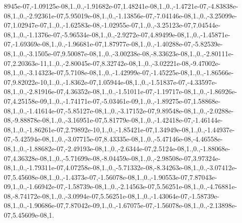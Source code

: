 {8945e-\/07,-\/1.\-09125e-\/08,1.,0.,-\/1.\-91682e-\/07,1.\-48241e-\/08,1.,0.,-\/1.\-4721e-\/07,-\/4.\-83838e-\/08,1.,0.,-\/2.\-92361e-\/07,5.\-95019e-\/08,1.,0.,-\/1.\-13856e-\/07,-\/7.\-04146e-\/08,1.,0.,-\/3.\-25099e-\/07,1.\-02947e-\/07,1.,0.,-\/1.\-62583e-\/08,-\/1.\-02955e-\/07,1.,0.,-\/3.\-25123e-\/07,7.\-04544e-\/08,1.,0.,-\/1.\-1376e-\/07,-\/5.\-96534e-\/08,1.,0.,-\/2.\-9272e-\/07,4.\-89499e-\/08,1.,0.,-\/1.\-45871e-\/07,-\/1.\-69369e-\/08,1.,0.,-\/1.\-96681e-\/07,1.\-87977e-\/08,1.,0.,-\/1.\-40288e-\/07,-\/5.\-82539e-\/08,1.,0.,-\/3.\-1505e-\/07,9.\-50087e-\/08,1.,0.,-\/3.\-00238e-\/08,-\/8.\-33623e-\/08,1.,0.,-\/2.\-80111e-\/07,2.\-20363e-\/11,1.,0.,-\/2.\-80045e-\/07,8.\-32742e-\/08,1.,0.,-\/3.\-02221e-\/08,-\/9.\-47002e-\/08,1.,0.,-\/3.\-14323e-\/07,5.\-7108e-\/08,1.,0.,-\/1.\-42999e-\/07,-\/1.\-45225e-\/08,1.,0.,-\/1.\-86566e-\/07,9.\-82022e-\/10,1.,0.,-\/1.\-8362e-\/07,1.\-05944e-\/08,1.,0.,-\/1.\-51837e-\/07,-\/4.\-33597e-\/08,1.,0.,-\/2.\-81916e-\/07,4.\-36352e-\/08,1.,0.,-\/1.\-51011e-\/07,-\/1.\-19717e-\/08,1.,0.,-\/1.\-86926e-\/07,4.\-25158e-\/09,1.,0.,-\/1.\-74171e-\/07,-\/5.\-03461e-\/09,1.,0.,-\/1.\-89275e-\/07,1.\-58868e-\/08,1.,0.,-\/1.\-41614e-\/07,-\/5.\-85127e-\/08,1.,0.,-\/3.\-17152e-\/07,9.\-89548e-\/08,1.,0.,-\/2.\-0288e-\/08,-\/9.\-88878e-\/08,1.,0.,-\/3.\-16951e-\/07,5.\-81779e-\/08,1.,0.,-\/1.\-42418e-\/07,-\/1.\-46144e-\/08,1.,0.,-\/1.\-86261e-\/07,2.\-79892e-\/10,1.,0.,-\/1.\-85421e-\/07,1.\-34949e-\/08,1.,0.,-\/1.\-44937e-\/07,-\/5.\-42594e-\/08,1.,0.,-\/3.\-07715e-\/07,8.\-43335e-\/08,1.,0.,-\/5.\-47146e-\/08,-\/4.\-46558e-\/08,1.,0.,-\/1.\-88682e-\/07,-\/2.\-49193e-\/08,1.,0.,-\/2.\-6344e-\/07,2.\-5124e-\/08,1.,0.,-\/1.\-88068e-\/07,4.\-36328e-\/08,1.,0.,-\/5.\-71699e-\/08,-\/8.\-04459e-\/08,1.,0.,-\/2.\-98508e-\/07,3.\-97324e-\/08,1.,0.,-\/1.\-79311e-\/07,4.\-07258e-\/08,1.,0.,-\/5.\-71332e-\/08,-\/8.\-34263e-\/08,1.,0.,-\/3.\-07412e-\/07,5.\-45608e-\/08,1.,0.,-\/1.\-4373e-\/07,-\/1.\-56078e-\/08,1.,0.,-\/1.\-90553e-\/07,7.\-87043e-\/09,1.,0.,-\/1.\-66942e-\/07,-\/1.\-58739e-\/08,1.,0.,-\/2.\-14563e-\/07,5.\-56251e-\/08,1.,0.,-\/4.\-76881e-\/08,-\/8.\-74172e-\/08,1.,0.,-\/3.\-0994e-\/07,5.\-56251e-\/08,1.,0.,-\/1.\-43064e-\/07,-\/1.\-58739e-\/08,1.,0.,-\/1.\-90686e-\/07,7.\-87042e-\/09,1.,0.,-\/1.\-67075e-\/07,-\/1.\-56078e-\/08,1.,0.,-\/2.\-13898e-\/07,5.\-45609e-\/08,1.}
